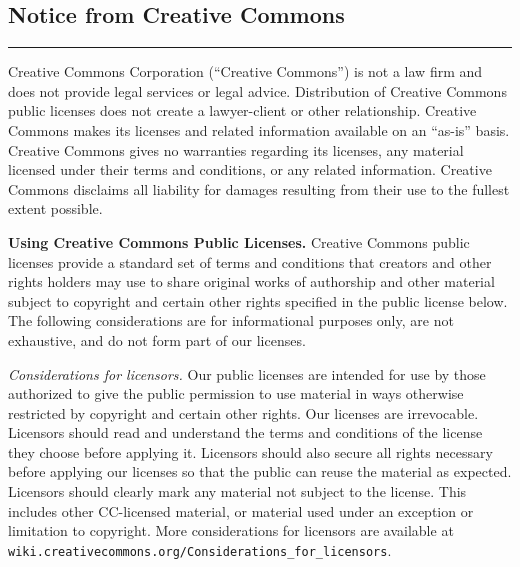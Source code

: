 \subsection*{Notice from Creative Commons}

\noindent\rule{\textwidth}{0.2pt}
\smallskip

Creative Commons Corporation (``Creative Commons'') is not a law firm and does not provide legal services or legal advice. Distribution of Creative Commons public licenses does not create a lawyer-client or other relationship. Creative Commons makes its licenses and related information available on an ``as-is'' basis. Creative Commons gives no warranties regarding its licenses, any material licensed under their terms and conditions, or any related information. Creative Commons disclaims all liability for damages resulting from their use to the fullest extent possible.

\medskip
\textbf{Using Creative Commons Public Licenses.} Creative Commons public licenses provide a standard set of terms and conditions that creators and other rights holders may use to share original works of authorship and other material subject to copyright and certain other rights specified in the public license below. The following considerations are for informational purposes only, are not exhaustive, and do not form part of our licenses.

\medskip
\textit{Considerations for licensors.} Our public licenses are intended for use by those authorized to give the public permission to use material in ways otherwise restricted by copyright and certain other rights. Our licenses are irrevocable. Licensors should read and understand the terms and conditions of the license they choose before applying it. Licensors should also secure all rights necessary before applying our licenses so that the public can reuse the material as expected. Licensors should clearly mark any material not subject to the license. This includes other CC-licensed material, or material used under an exception or limitation to copyright. More considerations for licensors are available at \nolinkurl{wiki.creativecommons.org/Considerations_for_licensors}.

